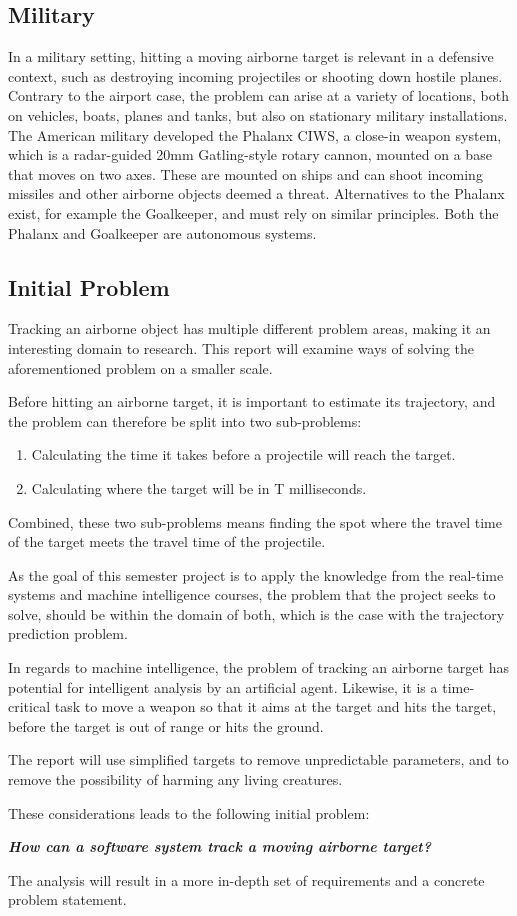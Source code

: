 \subsection{Military}
In a military setting, hitting a moving airborne target is relevant in a defensive context, such as destroying incoming projectiles or shooting down hostile planes.
Contrary to the airport case, the problem can arise at a variety of locations, both on vehicles, boats, planes and tanks, but also on stationary military installations.
The American military developed the Phalanx CIWS, a close-in weapon system, which is a radar-guided 20mm Gatling-style rotary cannon, mounted on a base that moves on two axes.
These are mounted on ships and can shoot incoming missiles and other airborne objects deemed a threat.
Alternatives to the Phalanx exist, for example the Goalkeeper, and must rely on similar principles.
Both the Phalanx and Goalkeeper are autonomous systems.

\subsection{Initial Problem}
Tracking an airborne object has multiple different problem areas, making it an interesting domain to research.
This report will examine ways of solving the aforementioned problem on a smaller scale.

Before hitting an airborne target, it is important to estimate its trajectory, and the problem can therefore be split into two sub-problems:
\begin{enumerate}
  \item Calculating the time it takes before a projectile will reach the target.
  \item Calculating where the target will be in T milliseconds.
\end{enumerate}
Combined, these two sub-problems means finding the spot where the travel time of the target meets the travel time of the projectile.

As the goal of this semester project is to apply the knowledge from the real-time systems and machine intelligence courses, the problem that the project seeks to solve, should be within the domain of both, which is the case with the trajectory prediction problem.

In regards to machine intelligence, the problem of tracking an airborne target has potential for intelligent analysis by an artificial agent.
Likewise, it is a time-critical task to move a weapon so that it aims at the target and hits the target, before the target is out of range or hits the ground.

The report will use simplified targets to remove unpredictable parameters, and to remove the possibility of harming any living creatures.

These considerations leads to the following initial problem:
\label{key:initialProblem}
\begin{center}
  \textit{\textbf{How can a software system track a moving airborne target?}}
\end{center}
The analysis will result in a more in-depth set of requirements and a concrete problem statement.
